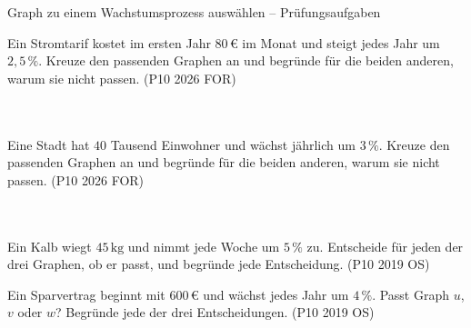 \begin{aufgabe}{Graph zu einem Wachstumsprozess auswählen – Prüfungsaufgaben}
\begin{teile}
\teil Ein Stromtarif kostet im ersten Jahr $80\,€$ im Monat und steigt jedes Jahr um $2{,}5\,\%$. Kreuze den passenden Graphen an und begründe für die beiden anderen, warum sie nicht passen. \hfill (P10 2026 FOR) \\  \\  \\ 

\begin{ksys}[xmin=0,xmax=10,ymin=0,ymax=120,xstep=1,ystep=10,xlabel=t in Jahren,ylabel=Euro,ablesen]    \end{ksys}
\teil Eine Stadt hat $40$ Tausend Einwohner und wächst jährlich um $3\,\%$. Kreuze den passenden Graphen an und begründe für die beiden anderen, warum sie nicht passen. \hfill (P10 2026 FOR) \\  \\  \\ 

\begin{ksys}[xmin=0,xmax=10,ymin=0,ymax=60,xstep=1,ystep=5,xlabel=t in Jahren,ylabel=Tausend,ablesen]    \end{ksys}
\steil Ein Kalb wiegt $45\,\mathrm{kg}$ und nimmt jede Woche um $5\,\%$ zu. Entscheide für jeden der drei Graphen, ob er passt, und begründe jede Entscheidung. \hfill (P10 2019 OS)

\begin{ksys}[xmin=0,xmax=10,ymin=0,ymax=80,xstep=1,ystep=10,xlabel=t in Wochen,ylabel=kg,ablesen]    \end{ksys}
\steil Ein Sparvertrag beginnt mit $600\,€$ und wächst jedes Jahr um $4\,\%$. Passt Graph $u$, $v$ oder $w$? Begründe jede der drei Entscheidungen. \hfill (P10 2019 OS)

\begin{ksys}[xmin=0,xmax=10,ymin=0,ymax=1000,xstep=1,ystep=100,xlabel=t in Jahren,ylabel=Euro,ablesen]    \end{ksys}
\end{teile}
\end{aufgabe}

